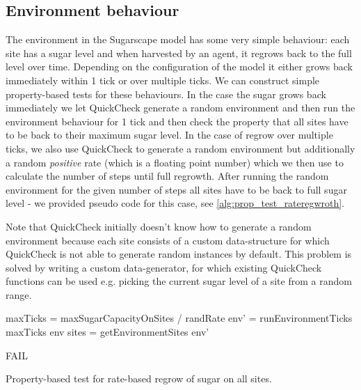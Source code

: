 \subsection{Environment behaviour}
The environment in the Sugarscape model has some very simple behaviour: each site has a sugar level and when harvested by an agent, it regrows back to the full level over time. Depending on the configuration of the model it either grows back immediately within 1 tick or over multiple ticks. We can construct simple property-based tests for these behaviours. In the case the sugar grows back immediately we let QuickCheck generate a random environment and then run the environment behaviour for 1 tick and then check the property that all sites have to be back to their maximum sugar level. In the case of regrow over multiple ticks, we also use QuickCheck to generate a random environment but additionally a random \textit{positive} rate (which is a floating point number) which we then use to calculate the number of steps until full regrowth. After running the random environment for the given number of steps all sites have to be back to full sugar level - we provided pseudo code for this case, see \ref{alg:prop_test_rateregwroth}.

Note that QuickCheck initially doesn't know how to generate a random environment because each site consists of a custom data-structure for which QuickCheck is not able to generate random instances by default. This problem is solved by writing a custom data-generator, for which existing QuickCheck functions can be used e.g. picking the current sugar level of a site from a random range.

%

\begin{algorithm}
maxTicks = maxSugarCapacityOnSites / randRate\;
env' = runEnvironmentTicks maxTicks env\;
sites = getEnvironmentSites env'\;

 {
  FAIL\;
}
\caption{Property-based test for rate-based regrow of sugar on all sites.}
\end{algorithm}
\label{alg:prop_test_rateregwroth}

